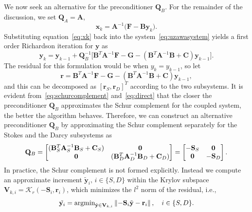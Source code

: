 We now seek an alternative for the preconditioner $\mathbf{Q}_B$.
For the remainder of the discussion, we set $\mathbf{Q}_A = \mathbf{A}$, 
\begin{equation}\label{eq:xk}
		  \mathbf{x}_k = \mathbf{A}^{-1} \big(\mathbf{F} - \mathbf{B}\mathbf{y}_k \big).
\end{equation}
Substituting equation~\eqref{eq:xk} back into the system~\eqref{eq:uzawasystem}
yields a first order Richardson iteration for $\mathbf{y}$ as
\begin{equation}
		  \mathbf{y}_{k} = \mathbf{y}_{k-1} + \mathbf{Q}_B^{-1}\big[\mathbf{B}^T\mathbf{A}^{-1}\mathbf{F} - \mathbf{G} - (\mathbf{B}^T\mathbf{A}^{-1}\mathbf{B} + \mathbf{C})\mathbf{y}_{k-1}\big].
\end{equation}
The residual for this formulation would be when $y_k= y_{k-1}$, so let
\begin{equation}
\mathbf{r} = \mathbf{B}^T\mathbf{A}^{-1}\mathbf{F} - \mathbf{G} - (\mathbf{B}^T\mathbf{A}^{-1}\mathbf{B} + 
\mathbf{C})\mathbf{y}_{k-1},
\end{equation}
and this can be decomposed as $[\mathbf{r}_S,\mathbf{r}_D]^T$ according to the two subsystems.
It is evident from~\eqref{eq:schurcomplement} and~\eqref{eq:direct} that the 
closer the 
preconditioner $\mathbf{Q}_B$ approximates the Schur complement for the coupled system, 
the better the algorithm behaves.
Therefore, we can construct an alternative preconditioner $\mathbf{Q}_B$ 
by approximating the Schur complement separately for the Stokes and the Darcy subsystems as
\begin{equation}
		  \mathbf{Q}_B = \begin{bmatrix}
			 (\bold{B}_S^T\bold{A}_S^{-1}\bold{B}_S + \bold{C}_S) &\mathbf{0}\\
          \mathbf{0} & (\bold{B}_D^T\bold{A}_D^{-1}\bold{B}_D + \bold{C}_D)
		  \end{bmatrix} = \begin{bmatrix}
					 -\mathbf{S}_S & \mathbf{0}\\
					 \mathbf{0} & -\mathbf{S}_D
		  \end{bmatrix}.
\end{equation}
In practice, the Schur complement is not formed explicitly. Instead
we compute an approximate increment $\tilde{\mathbf{y}}_i,\, i\in\{S,D\}$ within the 
Krylov subspace $\mathbf{V}_{k,i} = \mathcal{K}_r(-\mathbf{S}_i, \mathbf{r}_i)$,
which minimizes the $l^2$ norm of the residual, i.e., 
\begin{equation}
\tilde{\mathbf{y}_i} = \text{argmin}_{\tilde{\bold{y}}\in \mathbf{V}_{k,i}}\left\lVert-\mathbf{S}_i \tilde{\mathbf{y}} - \mathbf{r}_i\right\rVert, \quad i \in \{S,D\}.
\end{equation}
